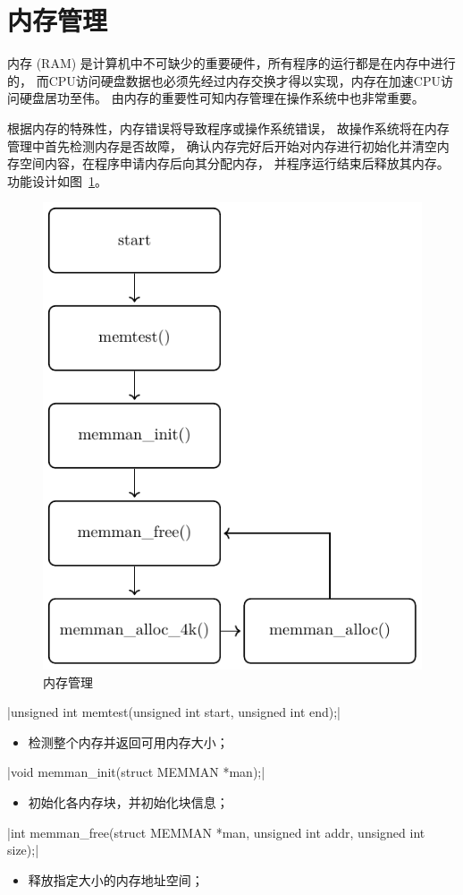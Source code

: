 \section{内存管理}

内存 (RAM) 是计算机中不可缺少的重要硬件，所有程序的运行都是在内存中进行的，
而CPU访问硬盘数据也必须先经过内存交换才得以实现，内存在加速CPU访问硬盘居功至伟。
由内存的重要性可知内存管理在操作系统中也非常重要。	

根据内存的特殊性，内存错误将导致程序或操作系统错误，
故操作系统将在内存管理中首先检测内存是否故障，
确认内存完好后开始对内存进行初始化并清空内存空间内容，在程序申请内存后向其分配内存，
并程序运行结束后释放其内存。功能设计如图~\ref{fig:memman}。
\begin{figure}[H]
  \centering
  \includegraphics[width=.5\textwidth]{../Fig/func/memman.pdf}
  \caption{内存管理}
  \label{fig:memman}
\end{figure}

\csingle|unsigned int memtest(unsigned int start, unsigned int end);|
\begin{itemize}
  \item 检测整个内存并返回可用内存大小；
\end{itemize}

\csingle|void memman_init(struct MEMMAN *man);|
\begin{itemize}
  \item 初始化各内存块，并初始化块信息；
\end{itemize}

\csingle|int memman_free(struct MEMMAN *man, unsigned int addr, unsigned int size);|
\begin{itemize}
  \item 释放指定大小的内存地址空间；
\end{itemize}

